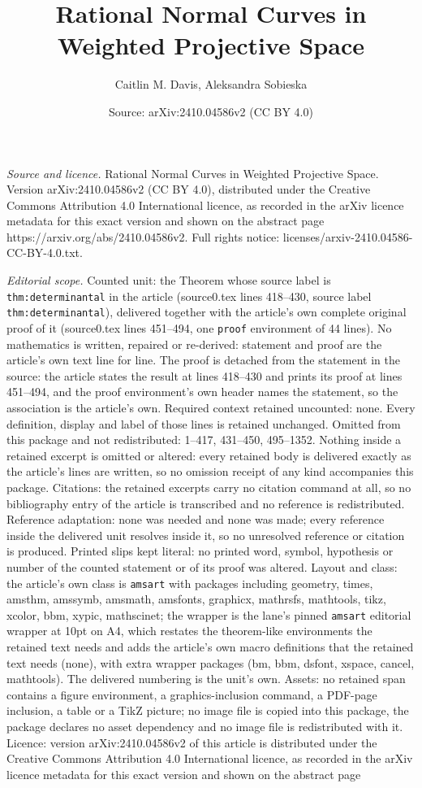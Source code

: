 \documentclass[10pt,a4paper]{amsart}
\title[Rational Normal Curves in Weighted Projective Space]{Rational Normal Curves in Weighted Projective Space}
\author{Caitlin M. Davis, Aleksandra Sobieska}
\date{Source: arXiv:2410.04586v2 (CC BY 4.0)}
\begin{document}
\maketitle

\noindent\emph{Source and licence.} Rational Normal Curves in Weighted Projective Space. Version arXiv:2410.04586v2 (CC BY 4.0), distributed under the Creative Commons Attribution 4.0 International licence, as recorded in the arXiv licence metadata for this exact version and shown on the abstract page https://arxiv.org/abs/2410.04586v2. Full rights notice: licenses/arxiv-2410.04586-CC-BY-4.0.txt.\par\smallskip

\noindent\textit{Editorial scope.} Counted unit: the Theorem whose source label is \texttt{thm:determinantal} in the article (source0.tex lines 418--430, source label \texttt{thm:determinantal}), delivered together with the article's own complete original proof of it (source0.tex lines 451--494, one \texttt{proof} environment of 44 lines). No mathematics is written, repaired or re-derived: statement and proof are the article's own text line for line. The proof is detached from the statement in the source: the article states the result at lines 418--430 and prints its proof at lines 451--494, and the proof environment's own header names the statement, so the association is the article's own. Required context retained uncounted: none. Every definition, display and label of those lines is retained unchanged. Omitted from this package and not redistributed: 1--417, 431--450, 495--1352. Nothing inside a retained excerpt is omitted or altered: every retained body is delivered exactly as the article's lines are written, so no omission receipt of any kind accompanies this package. Citations: the retained excerpts carry no citation command at all, so no bibliography entry of the article is transcribed and no reference is redistributed. Reference adaptation: none was needed and none was made; every reference inside the delivered unit resolves inside it, so no unresolved reference or citation is produced. Printed slips kept literal: no printed word, symbol, hypothesis or number of the counted statement or of its proof was altered. Layout and class: the article's own class is \texttt{amsart} with packages including geometry, times, amsthm, amssymb, amsmath, amsfonts, graphicx, mathrsfs, mathtools, tikz, xcolor, bbm, xypic, mathscinet; the wrapper is the lane's pinned \texttt{amsart} editorial wrapper at 10pt on A4, which restates the theorem-like environments the retained text needs and adds the article's own macro definitions that the retained text needs (none), with extra wrapper packages (bm, bbm, dsfont, xspace, cancel, mathtools). The delivered numbering is the unit's own. Assets: no retained span contains a figure environment, a graphics-inclusion command, a PDF-page inclusion, a table or a TikZ picture; no image file is copied into this package, the package declares no asset dependency and no image file is redistributed with it. Licence: version arXiv:2410.04586v2 of this article is distributed under the Creative Commons Attribution 4.0 International licence, as recorded in the arXiv licence metadata for this exact version and shown on the abstract page 
\end{document}
